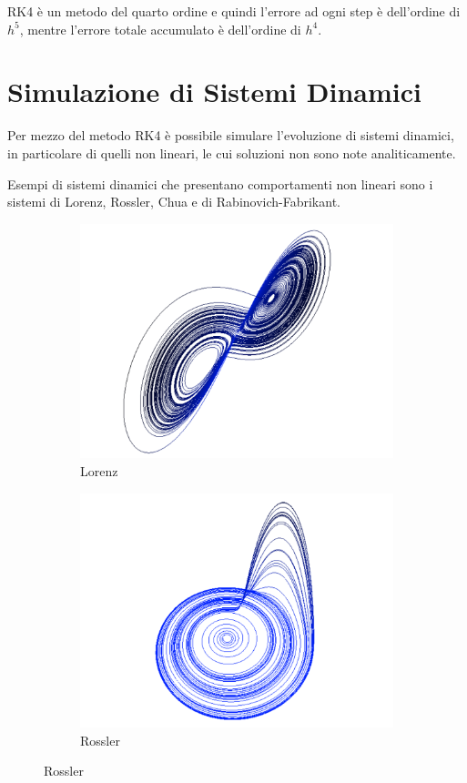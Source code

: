 RK4 è un metodo del quarto ordine e quindi l'errore ad ogni step è dell'ordine di $h^5$, mentre l'errore totale accumulato è dell'ordine di $h^4$.

\section{Simulazione di Sistemi Dinamici}
Per mezzo del metodo RK4 è possibile simulare l'evoluzione di sistemi dinamici, in particolare di quelli non lineari, le cui soluzioni non sono note analiticamente.

Esempi di sistemi dinamici che presentano comportamenti non lineari sono i sistemi di Lorenz, Rossler, Chua e di Rabinovich-Fabrikant.

\begin{figure}[H]
 \begin{subfigure}[b]{0.5\textwidth}
  \centering
  \includegraphics[width=\textwidth]{lorenz}
  \caption{Lorenz}
  \label{fig:lorenz}
 \end{subfigure}
 \begin{subfigure}[b]{0.5\textwidth}
  \centering
  \includegraphics[width=\textwidth]{rossler}
  \caption{Rossler}
  \label{fig:rossler}
 \end{subfigure}


\end{figure}
